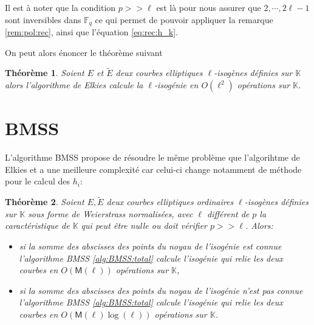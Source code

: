 \documentclass[10pt,a4paper]{book}
\theoremstyle{plain}
\newtheorem{thm}{Théorème}[chapter]
\theoremstyle{definition}
\theoremstyle{definition}
\theoremstyle{definition}
\theoremstyle{definition}
\theoremstyle{remark}
\theoremstyle{remark}
\theoremstyle{definition}
\begin{document}
Il est à noter que la condition $p >> \ell$ est là pour nous assurer que $2, \cdots, 2\ell-1$ sont inversibles dans $\mathbb{F}_q$ ce qui permet de pouvoir appliquer la remarque \ref{rem:pol:rec}, ainsi que l'équation \eqref{eq:rec:h_k}.

On peut alors énoncer le théorème suivant
\begin{thm}
Soient $E$ et $\tilde{E}$ deux courbes elliptiques $\ell$-isogènes définies sur $\mathbb{K}$ alors l'algorithme de Elkies calcule la $\ell$-isogénie en $O(\ell^2)$ opérations sur $\mathbb{K}$.
\end{thm}
 
\section{BMSS}
L'algorithme BMSS \cite{BMSS08} propose de résoudre le même problème que l'algorihtme de Elkies \cite{elkies1998} et a une meilleure complexité car celui-ci change notamment de méthode pour le calcul des $h_i$:
\begin{thm}
\label{thm:BMSS}
Soient $E, \tilde{E}$ deux courbes elliptiques ordinaires $\ell$-isogènes définies sur $\mathbb{K}$ sous forme de Weierstrass normalisées, avec $\ell$ différent de $p$ la caractéristique de $\mathbb{K}$ qui peut être nulle ou doit vérifier $p >> \ell$. Alors:
\begin{itemize}
\item  si la somme des abscisses des points du noyau de l'isogénie est connue l'algorithme BMSS \ref{alg:BMSS:total} calcule l'isogénie qui relie les deux courbes en $O(\mathsf{M}(\ell))$ opérations sur $\mathbb{K}$,
\item si la somme des abscisses des points du noyau de l'isogénie n'est pas connue l'algorithme BMSS \ref{alg:BMSS:total} calcule l'isogénie qui relie les deux courbes en $O(\mathsf{M}(\ell)\log(\ell))$ opérations sur $\mathbb{K}$.
\end{itemize}
\end{thm}
\end{document}
